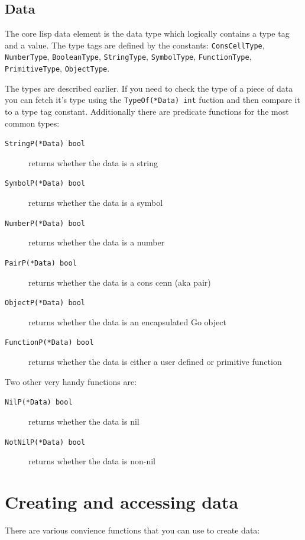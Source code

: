 \documentclass[12pt]{article}
\begin{document}
\subsection{Data}

The core lisp data element is the data type which logically
contains a type tag and a value. The type tags are defined by the
constants: \verb|ConsCellType|, \verb|NumberType|, \verb|BooleanType|,
\verb|StringType|, \verb|SymbolType|, \verb|FunctionType|,
\verb|PrimitiveType|, \verb|ObjectType|.

\noindent The types are described earlier. If you need to check the
type of a piece of data you can fetch it's type using the
\verb|TypeOf(*Data) int| fuction and then compare it to a type tag
constant. Additionally there are predicate functions for the most
common types: 

\begin{description}
\item [{\tt StringP(*Data) bool}] returns whether the data is a string
\item [{\tt SymbolP(*Data) bool}] returns whether the data is a symbol
\item [{\tt NumberP(*Data) bool}] returns whether the data is a number
\item [{\tt PairP(*Data) bool}] returns whether the data is a cons cenn
  (aka pair)
\item [{\tt ObjectP(*Data) bool}] returns whether the data is an
  encapsulated Go object 
\item [{\tt FunctionP(*Data) bool}] returns whether the data is either
  a user defined or primitive function
\end{description}

\noindent Two other very handy functions are:

\begin{description}
\item [{\tt NilP(*Data) bool}] returns whether the data is nil
\item [{\tt NotNilP(*Data) bool}] returns whether the data is non-nil
\end{description}

\section{Creating and accessing data}

There are various convience functions that you can use to create data:
\end{document}
